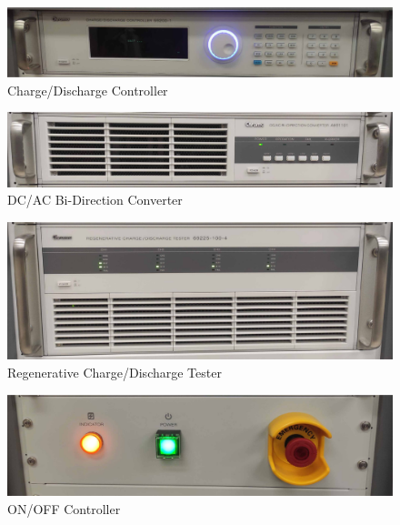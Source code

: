 \begin{center}
	\begin{figure}[H]
		\includegraphics[width=1\linewidth]{Chapters/img/Charge_Discharge_Controller.jpg}
			\centering
			\captionsetup{justification=centering,margin=2cm}
			\caption{Charge/Discharge Controller}
	\end{figure}
	\begin{figure}[H]
		\includegraphics[width=1\linewidth]{Chapters/img/Bi_Direction_Converter.jpg}
			\centering
			\captionsetup{justification=centering,margin=2cm}
			\caption{DC/AC Bi-Direction Converter}
	\end{figure}
	\begin{figure}[H]
		\includegraphics[width=1\linewidth]{Chapters/img/Regenerative_Charge_Discharge.jpg}
			\centering
			\captionsetup{justification=centering,margin=2cm}
			\caption{Regenerative Charge/Discharge Tester}
	\end{figure}
	\begin{figure}[H]
		\includegraphics[width=1\linewidth]{Chapters/img/ON_OFF_Controller.jpg}
			\centering
			\captionsetup{justification=centering,margin=2cm}
			\caption{ON/OFF Controller}
	\end{figure}
\end{center}
\vfill
